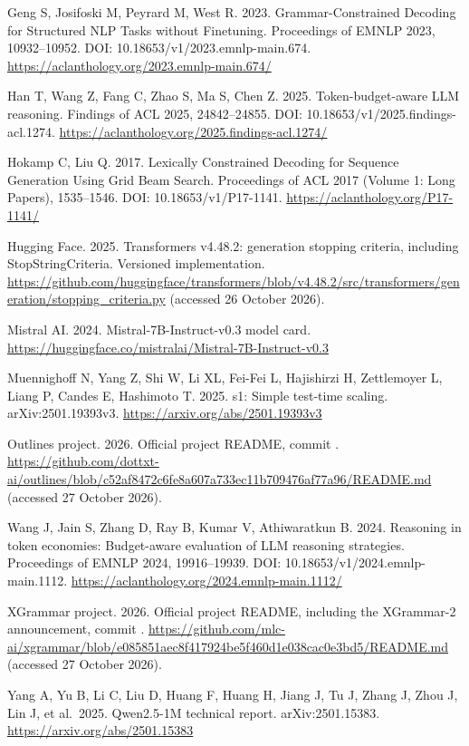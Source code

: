 \documentclass[
  12pt,
  a4paper,
]{article}
\begin{document}
Geng S, Josifoski M, Peyrard M, West R. 2023. Grammar-Constrained
Decoding for Structured NLP Tasks without Finetuning. Proceedings of
EMNLP 2023, 10932--10952. DOI: 10.18653/v1/2023.emnlp-main.674.
\url{https://aclanthology.org/2023.emnlp-main.674/}

Han T, Wang Z, Fang C, Zhao S, Ma S, Chen Z. 2025. Token-budget-aware
LLM reasoning. Findings of ACL 2025, 24842--24855. DOI:
10.18653/v1/2025.findings-acl.1274.
\url{https://aclanthology.org/2025.findings-acl.1274/}

Hokamp C, Liu Q. 2017. Lexically Constrained Decoding for Sequence
Generation Using Grid Beam Search. Proceedings of ACL 2017 (Volume 1:
Long Papers), 1535--1546. DOI: 10.18653/v1/P17-1141.
\url{https://aclanthology.org/P17-1141/}

Hugging Face. 2025. Transformers v4.48.2: generation stopping criteria,
including StopStringCriteria. Versioned implementation.
\url{https://github.com/huggingface/transformers/blob/v4.48.2/src/transformers/generation/stopping_criteria.py}
(accessed 26 October 2026).

Mistral AI. 2024. Mistral-7B-Instruct-v0.3 model card.
\url{https://huggingface.co/mistralai/Mistral-7B-Instruct-v0.3}

Muennighoff N, Yang Z, Shi W, Li XL, Fei-Fei L, Hajishirzi H,
Zettlemoyer L, Liang P, Candes E, Hashimoto T. 2025. s1: Simple
test-time scaling. arXiv:2501.19393v3.
\url{https://arxiv.org/abs/2501.19393v3}

Outlines project. 2026. Official project README, commit
\texttt{}.
\url{https://github.com/dottxt-ai/outlines/blob/c52af8472c6fe8a607a733ec11b709476af77a96/README.md}
(accessed 27 October 2026).

Wang J, Jain S, Zhang D, Ray B, Kumar V, Athiwaratkun B. 2024. Reasoning
in token economies: Budget-aware evaluation of LLM reasoning strategies.
Proceedings of EMNLP 2024, 19916--19939. DOI:
10.18653/v1/2024.emnlp-main.1112.
\url{https://aclanthology.org/2024.emnlp-main.1112/}

XGrammar project. 2026. Official project README, including the
XGrammar-2 announcement, commit
\texttt{}.
\url{https://github.com/mlc-ai/xgrammar/blob/e085851aec8f417924be5f460d1e038cac0e3bd5/README.md}
(accessed 27 October 2026).

Yang A, Yu B, Li C, Liu D, Huang F, Huang H, Jiang J, Tu J, Zhang J,
Zhou J, Lin J, et al.~2025. Qwen2.5-1M technical report.
arXiv:2501.15383. \url{https://arxiv.org/abs/2501.15383}
\end{document}
